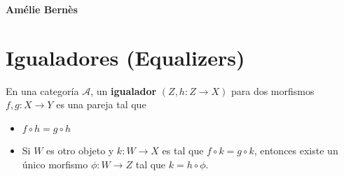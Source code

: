 \documentclass[10pt]{article}
\newtheorem[M]{teo}{Teorema}[section]
\newtheorem[M]{listaObj}[teo]{Lista de deseos}
\newtheorem[M]{preg}[teo]{Pregunta}
\newtheorem[M]{lema}[teo]{Lema}
\newtheorem[M]{hip}[teo]{Hipótesis}
\newtheorem[M]{prop}[teo]{Proposición}
\newtheorem[M]{obs}[teo]{Observación}
\newtheorem[M]{cor}[teo]{Corolario}
\newtheorem[M]{defi}[teo]{Definición}
\newtheorem[M]{notacion}[teo]{Notación}
\newtheorem[M]{nota}[teo]{Nota}
\begin{document}
\begin{flushright}
\textbf{Amélie Bernès}
\end{flushright}

\section{Igualadores (Equalizers)}
En una categoría $\mathcal{A}$, un \textbf{igualador}
$(Z, h: Z \longrightarrow X)$ para dos morfismos 
$f, g : X \longrightarrow Y$ es una pareja tal que 

\begin{minipage}{0.5\textwidth}
\begin{itemize}
	\item $f \circ h = g \circ h$
	\item Si $W$ es otro objeto y $k : W \longrightarrow X$
	es tal que $f \circ k = g \circ k$, entonces
	existe un único morfismo $\phi: W \longrightarrow Z$
	tal que $k = h \circ \phi$. 
\end{itemize}
\end{minipage} \hfill
\end{document}

